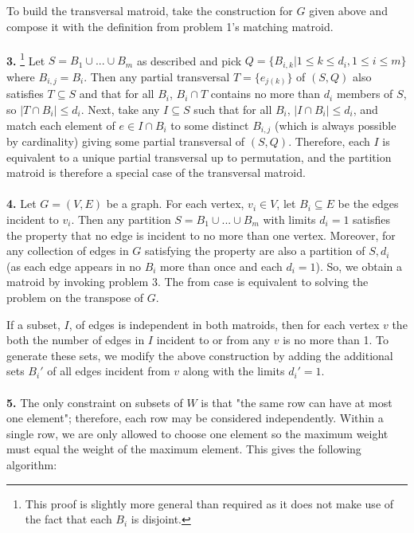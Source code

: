 \documentclass{article}
\begin{document}
To build the transversal matroid, take the construction for $G$ given above and compose it with the definition from problem 1's matching matroid.

\paragraph{} \textbf{3.}  \footnote{This proof is slightly more general than required as it does not make use of the fact that each $B_i$ is disjoint.}
Let $S = B_1 \cup ... \cup B_m$ as described and pick $Q = \{ B_{i,k} | 1 \leq k \leq d_i, 1 \leq i \leq m \}$ where $B_{i,j} = B_i$.  Then any partial transversal $T = \{ e_{j(k)} \}$ of $(S,Q)$ also satisfies $T \subseteq S$ and that for all $B_i$, $B_i \cap T$ contains no more than $d_i$ members of $S$, so $|T \cap B_i| \leq d_i$.  Next, take any $I \subseteq S$ such that for all $B_i$, $|I \cap B_i| \leq d_i$, and match each element of $e \in I \cap B_i$ to some distinct $B_{i,j}$ (which is always possible by cardinality) giving some partial transversal of $(S,Q)$.  Therefore, each $I$ is equivalent to a unique partial transversal up to permutation, and the partition matroid is therefore a special case of the transversal matroid. 

\paragraph{} \textbf{4.}
Let $G=(V,E)$ be a graph. For each vertex, $v_i \in V$, let $B_i \subseteq E$ be the edges incident to $v_i$.  Then any partition $S = B_1 \cup ... \cup B_m$ with limits $d_i = 1$ satisfies the property that no edge is incident to no more than one vertex.  Moreover, for any collection of edges in $G$ satisfying the property are also a partition of $S, d_i$ (as each edge appears in no $B_i$ more than once and each $d_i = 1$).  So, we obtain a matroid by invoking problem 3.  The from case is equivalent to solving the problem on the transpose of $G$.

If a subset, $I$, of edges is independent in both matroids, then for each vertex $v$ the both the number of edges in $I$ incident to or from any $v$ is no more than 1.  To generate these sets, we modify the above construction by adding the additional sets $B_i'$ of all edges incident from $v$ along with the limits $d_i'=1$.

\paragraph{} \textbf{5.}
The only constraint on subsets of $W$ is that "the same row can have at most one element"; therefore, each row may be considered independently.  Within a single row, we are only allowed to choose one element so the maximum weight must equal the weight of the maximum element.  This gives the following algorithm:
\end{document}
